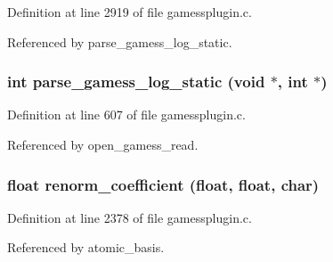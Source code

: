 Definition at line 2919 of file gamessplugin.c.

Referenced by parse\_\-gamess\_\-log\_\-static.
\subsubsection{\setlength{\rightskip}{0pt plus 5cm}int parse\_\-gamess\_\-log\_\-static (void $\ast$, int $\ast$)\hspace{0.3cm}{\tt  [static]}}\label{gamessplugin_8h_a17}




Definition at line 607 of file gamessplugin.c.

Referenced by open\_\-gamess\_\-read.
\subsubsection{\setlength{\rightskip}{0pt plus 5cm}float renorm\_\-coefficient (float, float, char)}\label{gamessplugin_8h_a24}




Definition at line 2378 of file gamessplugin.c.

Referenced by atomic\_\-basis.